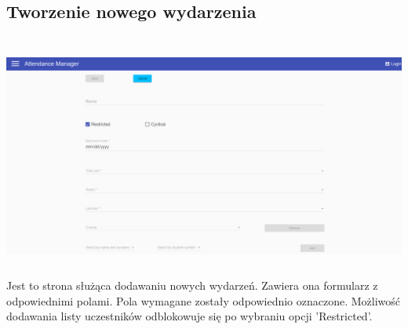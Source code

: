 \subsection{Tworzenie nowego wydarzenia}
\includegraphics[height=8cm,width=15cm]{images/AddNewEvent}
Jest to strona służąca dodawaniu nowych wydarzeń. Zawiera ona formularz z odpowiednimi polami. Pola wymagane zostały odpowiednio oznaczone. Możliwość dodawania listy uczestników odblokowuje się po wybraniu opcji 'Restricted'.